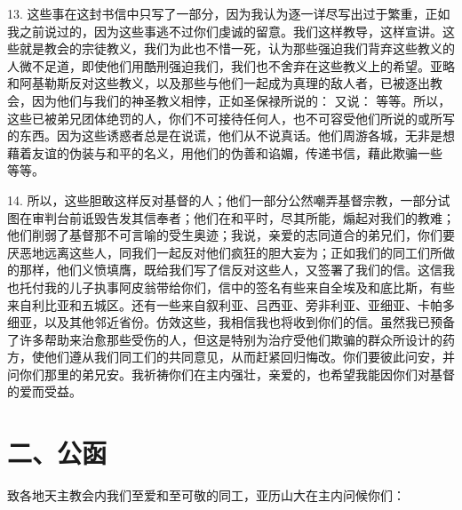 13. 这些事在这封书信中只写了一部分，因为我认为逐一详尽写出过于繁重，正如我之前说过的，因为这些事逃不过你们虔诚的留意。我们这样教导，这样宣讲。这些就是教会的宗徒教义，我们为此也不惜一死，认为那些强迫我们背弃这些教义的人微不足道，即使他们用酷刑强迫我们，我们也不舍弃在这些教义上的希望。亚略和阿基勒斯反对这些教义，以及那些与他们一起成为真理的敌人者，已被逐出教会，因为他们与我们的神圣教义相悖，正如圣保禄所说的：  又说：  等等。所以，这些已被弟兄团体绝罚的人，你们不可接待任何人，也不可容受他们所说的或所写的东西。因为这些诱惑者总是在说谎，他们从不说真话。他们周游各城，无非是想藉着友谊的伪装与和平的名义，用他们的伪善和谄媚，传递书信，藉此欺骗一些   等等。\par

14. 所以，这些胆敢这样反对基督的人；他们一部分公然嘲弄基督宗教，一部分试图在审判台前诋毁告发其信奉者；他们在和平时，尽其所能，煽起对我们的教难；他们削弱了基督那不可言喻的受生奥迹；我说，亲爱的志同道合的弟兄们，你们要厌恶地远离这些人，同我们一起反对他们疯狂的胆大妄为；正如我们的同工们所做的那样，他们义愤填膺，既给我们写了信反对这些人，又签署了我们的信。这信我也托付我的儿子执事阿皮翁带给你们，信中的签名有些来自全埃及和底比斯，有些来自利比亚和五城区。还有一些来自叙利亚、吕西亚、旁非利亚、亚细亚、卡帕多细亚，以及其他邻近省份。仿效这些，我相信我也将收到你们的信。虽然我已预备了许多帮助来治愈那些受伤的人，但这是特别为治疗受他们欺骗的群众所设计的药方，使他们遵从我们同工们的共同意见，从而赶紧回归悔改。你们要彼此问安，并问你们那里的弟兄安。我祈祷你们在主内强壮，亲爱的，也希望我能因你们对基督的爱而受益。\par


\section{二、公函}

致各地天主教会内我们至爱和至可敬的同工，亚历山大在主内问候你们：\par

